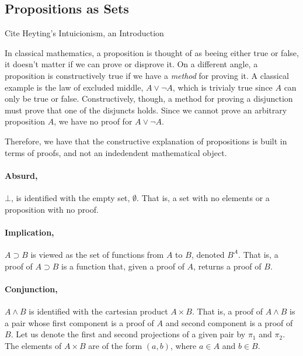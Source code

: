 \subsection{Propositions as Sets}
\label{subsec:martinlof:propositionsassets}

\begin{TODO}
  \item Cite Heyting's Intuicionism, an Introduction
\end{TODO}

In classical mathematics, a proposition is thought of as beeing either true or false, it doesn't
matter if we can prove or disprove it. On a different angle, a proposition is constructively true
if we have a \emph{method} for proving it. A classical example is the law of excluded middle, $A \vee \neg A$,
which is trivialy true since $A$ can only be true or false. Constructively, though, a method for proving a disjunction
must prove that one of the disjuncts holds. Since we cannot prove an arbitrary proposition $A$, we have
no proof for $A \vee \neg A$. 

Therefore, we have that the constructive explanation of propositions is built in terms of proofs, and
not an indedendent mathematical object. 

\paragraph{Absurd,} $\bot$, is identified with the empty set, $\emptyset$. That is, a set with no elements
or a proposition with no proof.

\paragraph{Implication,} $A \supset B$ is viewed as the set of functions from $A$ to $B$, denoted $B^A$. That is,
a proof of $A \supset B$ is a function that, given a proof of $A$, returns a proof of $B$.

\newcommand{\pone}{\pi_1}
\newcommand{\ptwo}{\pi_2}
\paragraph{Conjunction,} $A \wedge B$ is identified with the cartesian product $A \times B$. That is, a proof
of $A \wedge B$ is a pair whose first component is a proof of $A$ and second component is a proof of $B$.
Let us denote the first and second projections of a given pair by $\pone$ and $\ptwo$.
The elements of $A \times B$ are of the form $(a, b)$, where $a \in A$ and $b \in B$.

